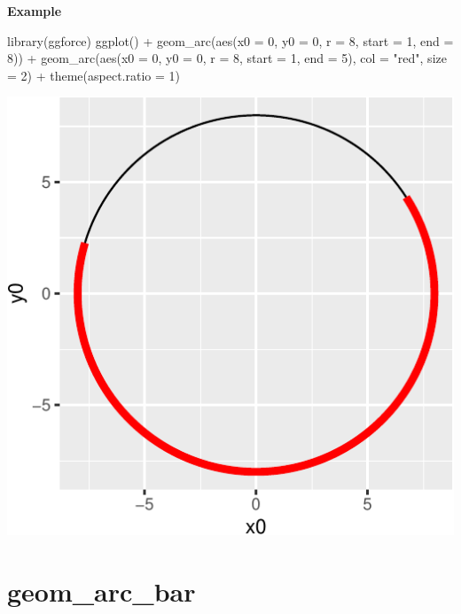 \documentclass[
  letterpaper,
  DIV=11,
  numbers=noendperiod]{scrreprt}
\newenvironment{Shaded}{\begin{snugshade}}{\end{snugshade}}
\newcommand{\AttributeTok}[1]{\textcolor[rgb]{0.40,0.45,0.13}{#1}}
\newcommand{\DecValTok}[1]{\textcolor[rgb]{0.68,0.00,0.00}{#1}}
\newcommand{\FunctionTok}[1]{\textcolor[rgb]{0.28,0.35,0.67}{#1}}
\newcommand{\NormalTok}[1]{\textcolor[rgb]{0.00,0.23,0.31}{#1}}
\newcommand{\SpecialCharTok}[1]{\textcolor[rgb]{0.37,0.37,0.37}{#1}}
\newcommand{\StringTok}[1]{\textcolor[rgb]{0.13,0.47,0.30}{#1}}
\begin{document}
\textbf{Example}

\begin{Shaded}
\begin{Highlighting}[]
\FunctionTok{library}\NormalTok{(ggforce)}
\FunctionTok{ggplot}\NormalTok{() }\SpecialCharTok{+}
  \FunctionTok{geom\_arc}\NormalTok{(}\FunctionTok{aes}\NormalTok{(}\AttributeTok{x0 =} \DecValTok{0}\NormalTok{, }\AttributeTok{y0 =} \DecValTok{0}\NormalTok{, }\AttributeTok{r =} \DecValTok{8}\NormalTok{, }\AttributeTok{start =} \DecValTok{1}\NormalTok{, }\AttributeTok{end =} \DecValTok{8}\NormalTok{)) }\SpecialCharTok{+}
  \FunctionTok{geom\_arc}\NormalTok{(}\FunctionTok{aes}\NormalTok{(}\AttributeTok{x0 =} \DecValTok{0}\NormalTok{, }\AttributeTok{y0 =} \DecValTok{0}\NormalTok{, }\AttributeTok{r =} \DecValTok{8}\NormalTok{, }\AttributeTok{start =} \DecValTok{1}\NormalTok{, }\AttributeTok{end =} \DecValTok{5}\NormalTok{), }\AttributeTok{col =} \StringTok{"red"}\NormalTok{, }\AttributeTok{size =} \DecValTok{2}\NormalTok{) }\SpecialCharTok{+}
  \FunctionTok{theme}\NormalTok{(}\AttributeTok{aspect.ratio =} \DecValTok{1}\NormalTok{)}
\end{Highlighting}
\end{Shaded}

\includegraphics{a_files/figure-pdf/arc-1.pdf}

\section{geom\_arc\_bar}\label{arcbar}
\end{document}
